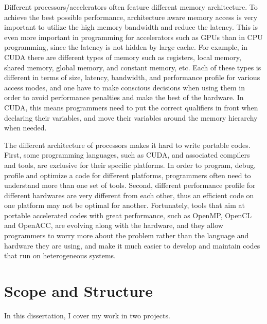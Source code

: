 Different processors/accelerators often feature different memory architecture.
To achieve the best possible performance, architecture aware memory access is 
very important to utilize the high memory bandwidth and reduce the latency.
This is even more important in programming for accelerators such as GPUs than in
CPU programming, since the latency is not hidden by large cache.
For example, in CUDA %
there are different types of memory such as registers, local memory, shared 
memory, global memory, and constant memory, etc. Each of these types is 
different in terms of size, latency, bandwidth, and performance profile for 
various access modes, and one have to make conscious decisions when using them
in order to avoid performance penalties and make the best of the hardware. 
In CUDA, this means programmers need to put the correct qualifiers in front when 
declaring their variables, and move their variables around the memory hierarchy 
when needed.
 

The different architecture of processors makes it hard to write portable codes.
First, some programming languages, such as CUDA, and associated compilers and tools,
 are exclusive for their specific platforms. In order to program, debug, profile 
and optimize a code for different platforms, programmers often need to understand 
more than one set of tools. 
Second, different performance profile for different hardwares are very
different from each other, thus an efficient code on one platform may not be
optimal for another. 
Fortunately, tools that aim at portable accelerated codes with great performance, such as 
OpenMP\cite{dagum1998openmp}, OpenCL\cite{Stone:2010:OPP:622179.1803953} and OpenACC\cite{OpenACC}, are evolving along with the hardware, and they allow programmers
to worry more about the problem rather than the language and hardware they are
using, and make it much easier to develop and maintain codes that run on heterogeneous systems.





\section{Scope and Structure}
In this dissertation, I cover my work in two projects.

